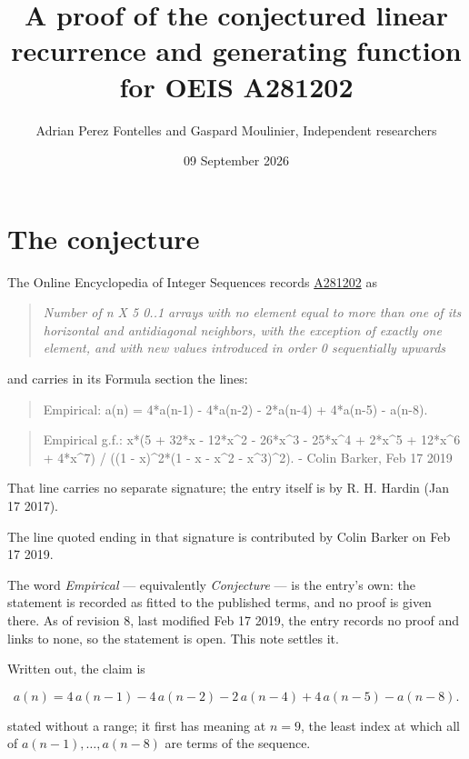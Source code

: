 \documentclass[11pt]{article}
\title{A proof of the conjectured linear recurrence and generating function for OEIS A281202}
\author{Adrian Perez Fontelles and Gaspard Moulinier, Independent researchers}
\date{09 September 2026}
\theoremstyle{definition}
\begin{document}
\maketitle
\section{The conjecture}

The Online Encyclopedia of Integer Sequences records \href{https://oeis.org/A281202}{A281202} as

\begin{quote}\itshape Number of n X 5 0..1 arrays with no element equal to more than one of its horizontal and antidiagonal neighbors, with the exception of exactly one element, and with new values introduced in order 0 sequentially upwards\end{quote}

and carries in its Formula section the lines:

\begin{quote}\ttfamily Empirical: a(n) = 4*a(n-1) - 4*a(n-2) - 2*a(n-4) + 4*a(n-5) - a(n-8).\end{quote}

\begin{quote}\ttfamily Empirical g.f.: x*(5 + 32*x - 12*x\textasciicircum{}2 - 26*x\textasciicircum{}3 - 25*x\textasciicircum{}4 + 2*x\textasciicircum{}5 + 12*x\textasciicircum{}6 + 4*x\textasciicircum{}7) / ((1 - x)\textasciicircum{}2*(1 - x - x\textasciicircum{}2 - x\textasciicircum{}3)\textasciicircum{}2). - Colin Barker, Feb 17 2019\end{quote}

That line carries no separate signature; the entry itself is by R. H. Hardin (Jan 17 2017).

The line quoted ending in that signature is contributed by Colin Barker on Feb 17 2019.

The word {\itshape Empirical} --- equivalently {\itshape Conjecture} --- is the entry's own: the statement is recorded as fitted to the published terms, and no proof is given there. As of revision 8, last modified Feb 17 2019, the entry records no proof and links to none, so the statement is open. This note settles it.

Written out, the claim is

\[a(n) = 4\,a(n-1) - 4\,a(n-2) - 2\,a(n-4) + 4\,a(n-5) - a(n-8).\]

stated without a range; it first has meaning at $n = 9$, the least index at which all of $a(n-1),\dots,a(n-8)$ are terms of the sequence.
\end{document}
